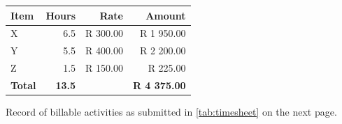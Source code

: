 \documentclass[
  11pt,
  a4paper,
  UKenglish,
  ]{article}
\begin{document}
\begin{table}[H]
\centering
\fontsize{10}{12}\selectfont
\begin{threeparttable}
\begin{tabular}[t]{lrrr}
\toprule
Item & Hours & Rate & Amount\\
\midrule
X & 6.5 & R 300.00 & R 1 950.00\\
Y & 5.5 & R 400.00 & R 2 200.00\\
Z & 1.5 & R 150.00 & R 225.00\\
\midrule
\textbf{Total} & \textbf{13.5} & \textbf{} & \textbf{R 4 375.00}\\
\bottomrule
\end{tabular}
\begin{tablenotes}[para]
\item Record of billable activities as submitted in \cref{tab:timesheet} on the next page.
\end{tablenotes}
\end{threeparttable}
\end{table}
\end{document}
